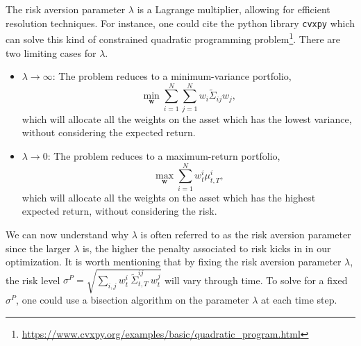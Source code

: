 \documentclass[a4paper,12pt]{report}
\begin{document}
The risk aversion parameter $\lambda$ is a Lagrange multiplier, allowing for efficient resolution techniques. For instance, one could cite the python library \texttt{cvxpy} which can solve this kind of constrained quadratic programming problem\footnote{\url{https://www.cvxpy.org/examples/basic/quadratic_program.html}}. There are two limiting cases for $\lambda$.
\begin{itemize}
\item $\lambda \rightarrow \infty$: The problem reduces to a minimum-variance portfolio,
$$\min_{\mathbf{w}} \sum_{i=1}^{N}\sum_{j=1}^{N} w_i \tilde{\Sigma}_{ij} w_j,$$
which will allocate all the weights on the asset which has the lowest variance, without considering the expected return.
\item $\lambda \rightarrow 0$: The problem reduces to a maximum-return portfolio,
$$\max_{\mathbf{w}}\sum_{i=1}^N w^i_t \mu^i_{t,T},$$
which will allocate all the weights on the asset which has the highest expected return, without considering the risk. 
\end{itemize} 

We can now understand why $\lambda$ is often referred to as the risk aversion parameter since the larger $\lambda$ is, the higher the penalty associated to risk kicks in in our optimization. It is worth mentioning that by fixing the risk aversion parameter $\lambda$, the risk level \mbox{$\sigma^P = \sqrt{\sum_{i,j} w^i_t~\tilde{\Sigma}^{ij}_{t,T}~w^j_t}$} will vary through time. To solve for a fixed $\sigma^P$, one could use a bisection algorithm on the parameter $\lambda$ at each time step.
\end{document}
